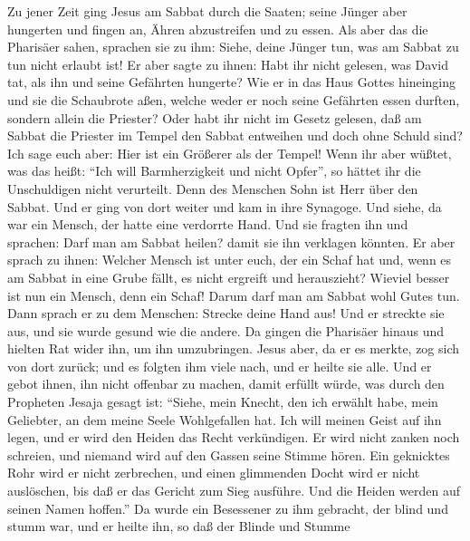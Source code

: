  Zu jener Zeit ging Jesus am Sabbat durch die Saaten;
seine Jünger aber hungerten und fingen an, Ähren abzustreifen und zu
essen.  Als aber das die Pharisäer sahen, sprachen sie zu
ihm: Siehe, deine Jünger tun, was am Sabbat zu tun nicht erlaubt ist!
 Er aber sagte zu ihnen: Habt ihr nicht gelesen, was David
tat, als ihn und seine Gefährten hungerte?  Wie er in das
Haus Gottes hineinging und sie die Schaubrote aßen, welche weder er noch
seine Gefährten essen durften, sondern allein die Priester?
 Oder habt ihr nicht im Gesetz gelesen, daß am Sabbat die
Priester im Tempel den Sabbat entweihen und doch ohne Schuld sind?
 Ich sage euch aber: Hier ist ein Größerer als der Tempel!
 Wenn ihr aber wüßtet, was das heißt: ``Ich will
Barmherzigkeit und nicht Opfer'', so hättet ihr die Unschuldigen nicht
verurteilt.  Denn des Menschen Sohn ist Herr über den
Sabbat.  Und er ging von dort weiter und kam in ihre
Synagoge.  Und siehe, da war ein Mensch, der hatte eine
verdorrte Hand. Und sie fragten ihn und sprachen: Darf man am Sabbat
heilen? damit sie ihn verklagen könnten.  Er aber sprach
zu ihnen: Welcher Mensch ist unter euch, der ein Schaf hat und, wenn es
am Sabbat in eine Grube fällt, es nicht ergreift und herauszieht?
 Wieviel besser ist nun ein Mensch, denn ein Schaf! Darum
darf man am Sabbat wohl Gutes tun.  Dann sprach er zu dem
Menschen: Strecke deine Hand aus! Und er streckte sie aus, und sie wurde
gesund wie die andere.  Da gingen die Pharisäer hinaus
und hielten Rat wider ihn, um ihn umzubringen.  Jesus
aber, da er es merkte, zog sich von dort zurück; und es folgten ihm
viele nach, und er heilte sie alle.  Und er gebot ihnen,
ihn nicht offenbar zu machen,  damit erfüllt würde, was
durch den Propheten Jesaja gesagt ist:  ``Siehe, mein
Knecht, den ich erwählt habe, mein Geliebter, an dem meine Seele
Wohlgefallen hat. Ich will meinen Geist auf ihn legen, und er wird den
Heiden das Recht verkündigen.  Er wird nicht zanken noch
schreien, und niemand wird auf den Gassen seine Stimme hören.
 Ein geknicktes Rohr wird er nicht zerbrechen, und einen
glimmenden Docht wird er nicht auslöschen, bis daß er das Gericht zum
Sieg ausführe.  Und die Heiden werden auf seinen Namen
hoffen.''  Da wurde ein Besessener zu ihm gebracht, der
blind und stumm war, und er heilte ihn, so daß der Blinde und Stumme
